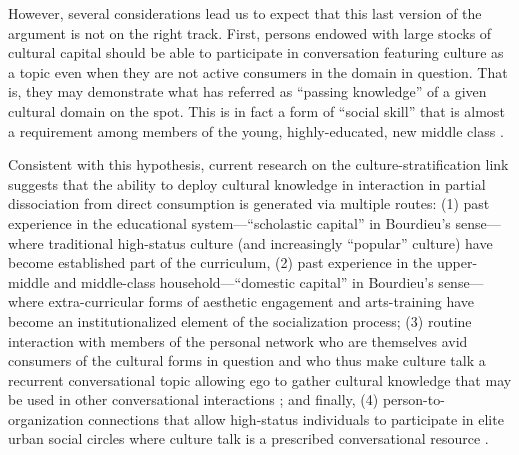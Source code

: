 However, several considerations lead us to expect that this last version of the argument is not on the right track.  First, persons endowed with large stocks of cultural capital should be able to participate in conversation featuring culture as a topic even when they are not active consumers in the domain in question. That is, they may demonstrate what \citet[252]{peterson92} has referred as ``passing knowledge'' of a given cultural domain on the spot.  This is in fact a form of ``social skill'' that is almost a requirement among members of the young, highly-educated, new middle class \citep{dimaggio96}.   

Consistent with this hypothesis, current research on the culture-stratification link suggests that the ability to deploy cultural knowledge in interaction in partial dissociation from direct consumption is generated via multiple routes:  (1) past experience in the educational system---``scholastic capital'' in Bourdieu's \citeyearpar[59]{bourdieu84} sense---where traditional high-status culture (and increasingly ``popular'' culture) have become established part of the curriculum, (2) past experience in the upper-middle and middle-class household---``domestic capital'' in Bourdieu's \citeyearpar[59]{bourdieu84} sense---where extra-curricular forms of aesthetic engagement and arts-training have become an institutionalized element of the socialization process; (3)  routine interaction with members of the personal network who are themselves avid consumers of the cultural forms in question and who thus make culture talk a recurrent conversational topic allowing ego to gather cultural knowledge that may be used in other conversational interactions \citep{cardon_granjon05}; and finally, (4) person-to-organization connections that allow high-status individuals to participate in elite urban social circles where culture talk is a prescribed conversational resource \citep{ostrower98}.

